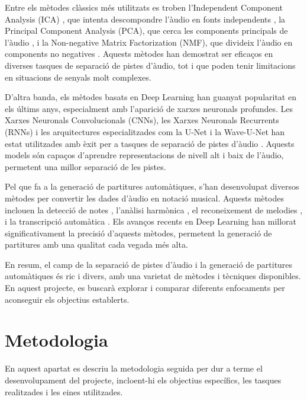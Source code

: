 \documentclass[10pt,a4paper,twocolumn,twoside]{article}
\begin{document}
Entre els mètodes clàssics més utilitzats es troben l'Independent Component Analysis (ICA) \cite{ICA_Sawada_Ono_Kameoka_Kitamura_Saruwatari_2019}, que intenta descompondre l'àudio en fonts independents \cite{ICA_hyvarinen2000independent}, la Principal Component Analysis (PCA), que cerca les components principals de l'àudio \cite{PCA_jolliffe2002principal}, i la Non-negative Matrix Factorization (NMF), que divideix l'àudio en components no negatives \cite{NMF_lee1999learning}. Aquests mètodes han demostrat ser eficaços en diverses tasques de separació de pistes d'àudio, tot i que poden tenir limitacions en situacions de senyals molt complexes.

D'altra banda, els mètodes basats en Deep Learning han guanyat popularitat en els últims anys, especialment amb l'aparició de xarxes neuronals profundes. Les Xarxes Neuronals Convolucionals (CNNs), les Xarxes Neuronals Recurrents (RNNs) i les arquitectures especialitzades com la U-Net i la Wave-U-Net han estat utilitzades amb èxit per a tasques de separació de pistes d'àudio \cite{hershey2016deep,grill2017two,CNN_jansson2017singing,lva2018waveunet}. Aquests models són capaços d'aprendre representacions de nivell alt i baix de l'àudio, permetent una millor separació de les pistes.

Pel que fa a la generació de partitures automàtiques, s'han desenvolupat diversos mètodes per convertir les dades d'àudio en notació musical. Aquests mètodes inclouen la detecció de notes \cite{raffel2014mir_eval}, l'anàlisi harmònica \cite{pardo2002improved}, el reconeixement de melodies \cite{abdallah2004fundamental}, i la transcripció automàtica \cite{benetos2013automatic}. Els avanços recents en Deep Learning han millorat significativament la precisió d'aquests mètodes, permetent la generació de partitures amb una qualitat cada vegada més alta.

En resum, el camp de la separació de pistes d'àudio i la generació de partitures automàtiques és ric i divers, amb una varietat de mètodes i tècniques disponibles. En aquest projecte, es buscarà explorar i comparar diferents enfocaments per aconseguir els objectius establerts.


\section{Metodologia}
\label{sec:metodologia}

En aquest apartat es descriu la metodologia seguida per dur a terme el desenvolupament del projecte, incloent-hi els objectius específics, les tasques realitzades i les eines utilitzades.
\end{document}
